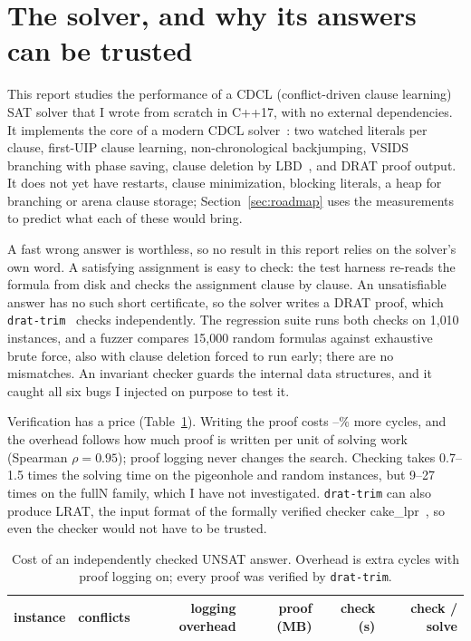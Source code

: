 \section{The solver, and why its answers can be trusted}
\label{sec:solver}

This report studies the performance of a CDCL (conflict-driven clause
learning) SAT solver that I wrote from scratch in C++17, with no external
dependencies. It implements the core of a modern CDCL
solver~\cite{marquessilva1999grasp,moskewicz2001chaff,een2003minisat}: two
watched literals per clause, first-UIP clause learning, non-chronological
backjumping, VSIDS branching with phase saving, clause deletion by
LBD~\cite{audemard2009glucose}, and DRAT proof output. It does not yet have
restarts, clause minimization, blocking literals, a heap for branching or
arena clause storage; Section~\ref{sec:roadmap} uses the measurements to
predict what each of these would bring.

A fast wrong answer is worthless, so no result in this report relies on the
solver's own word. A satisfying assignment is easy to check: the test harness
re-reads the formula from disk and checks the assignment clause by clause. An
unsatisfiable answer has no such short certificate, so the solver writes a
DRAT proof, which \texttt{drat-trim}~\cite{wetzler2014drattrim} checks
independently. The regression suite runs both checks on 1{,}010 instances, and
a fuzzer compares 15{,}000 random formulas against exhaustive brute force,
also with clause deletion forced to run early; there are no mismatches. An
invariant checker guards the internal data structures, and it caught all six
bugs I injected on purpose to test it.

Verification has a price (Table~\ref{tab:proofcost}). Writing the proof costs
\numProofOverheadMin--\numProofOverheadMax\% more cycles, and the overhead
follows how much proof is written per unit of solving work (Spearman
$\rho = 0.95$); proof logging never changes the search. Checking takes
0.7--1.5 times the solving time on the pigeonhole and random instances, but
9--27 times on the fullN family, which I have not investigated.
\texttt{drat-trim} can also produce LRAT, the input format of the formally
verified checker cake\_lpr~\cite{tan2021cakelpr}, so even the checker would
not have to be trusted.

\begin{table}[ht]
\centering\small
\begin{tabular}{lrrrrr}
\toprule
instance & conflicts & logging overhead & proof (MB) & check (s) & check / solve \\
\midrule

\end{tabular}
\caption{Cost of an independently checked UNSAT answer. Overhead is extra
cycles with proof logging on; every proof was verified by \texttt{drat-trim}.}
\label{tab:proofcost}
\end{table}
